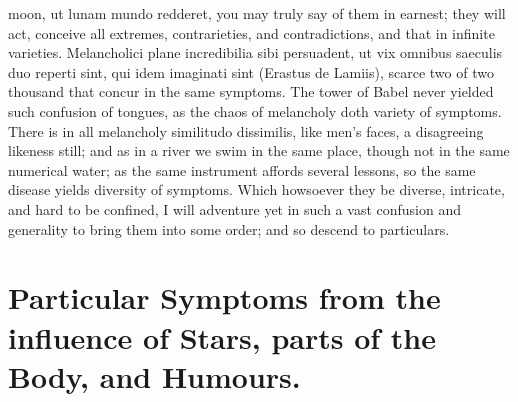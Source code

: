 {moon, ut lunam mundo redderet, you may truly say of them in earnest;
they will act, conceive all extremes, contrarieties, and
contradictions, and that in infinite varieties. Melancholici plane
incredibilia sibi persuadent, ut vix omnibus saeculis duo reperti sint,
qui idem imaginati sint (Erastus de Lamiis), scarce two of two thousand
that concur in the same symptoms. The tower of Babel never yielded such
confusion of tongues, as the chaos of melancholy doth variety of
symptoms. There is in all melancholy similitudo dissimilis, like men's
faces, a disagreeing likeness still; and as in a river we swim in the
same place, though not in the same numerical water; as the same
instrument affords several lessons, so the same disease yields
diversity of symptoms. Which howsoever they be diverse, intricate, and
hard to be confined, I will adventure yet in such a vast confusion and
generality to bring them into some order; and so descend to
particulars.

\section[Symptoms from the influence of Stars]{Particular Symptoms from the influence of Stars, parts of the Body, and Humours.}

}
